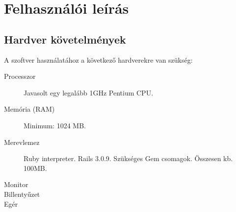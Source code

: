 \makeatletter
\def\thickhrulefill{\leavevmode \leaders \hrule height 1ex \hfill \kern \z@}
\def\@makechapterhead#1{%
  \vspace*{10\p@}%
  {\parindent \z@ \centering \reset@font
        {\Huge \scshape \thechapter}
        \par\nobreak
        \vspace*{15\p@}%
        \interlinepenalty\@M
        \begin{tabular}{@{\qquad}c@{\qquad}}
          \hline
          \\
          {\Huge \bfseries #1\par\nobreak} \\
          \\
          \hline
        \end{tabular}
    \vskip 100\p@
  }}
\def\@makeschapterhead#1{%
  \vspace*{10\p@}%
  {\parindent \z@ \centering \reset@font
        {\Huge \scshape \vphantom{\thechapter}}
        \par\nobreak
        \vspace*{15\p@}%
        \interlinepenalty\@M
        \begin{tabular}{@{\qquad}c@{\qquad}}
          \hline
          \\
          {\Huge \bfseries #1\par\nobreak} \\
          \\
          \hline
        \end{tabular}
    \vskip 100\p@
  }}

\chapter{Felhasználói leírás}

\section{Hardver követelmények} %
\label{sec:hardver_követelmények}
A szoftver használatához a következő hardverekre van szükség: 
\begin{description}
  \item[Processzor] Javasolt egy legalább 1GHz Pentium CPU.
  \item[Memória (RAM)] Minimum: 1024 MB.
  \item[Merevlemez] Ruby interpreter. Rails 3.0.9. Szükséges Gem csomagok. Összesen kb. 100MB.
  \item[Monitor]  
  \item[Billentyűzet] 
  \item[Egér] 
\end{description}

